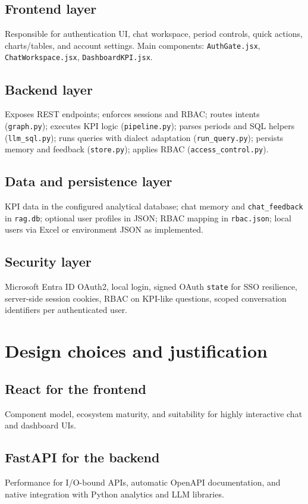 \documentclass[12pt,a4paper,openany]{report}
\begin{document}
\subsection{Frontend layer}
Responsible for authentication UI, chat workspace, period controls, quick actions, charts/tables, and account settings. Main components: \texttt{AuthGate.jsx}, \texttt{ChatWorkspace.jsx}, \texttt{DashboardKPI.jsx}.

\subsection{Backend layer}
Exposes REST endpoints; enforces sessions and RBAC; routes intents (\texttt{graph.py}); executes KPI logic (\texttt{pipeline.py}); parses periods and SQL helpers (\texttt{llm\_sql.py}); runs queries with dialect adaptation (\texttt{run\_query.py}); persists memory and feedback (\texttt{store.py}); applies RBAC (\texttt{access\_control.py}).

\subsection{Data and persistence layer}
KPI data in the configured analytical database; chat memory and \texttt{chat\_feedback} in \texttt{rag.db}; optional user profiles in JSON; RBAC mapping in \texttt{rbac.json}; local users via Excel or environment JSON as implemented.

\subsection{Security layer}
Microsoft Entra ID OAuth2, local login, signed OAuth \texttt{state} for SSO resilience, server-side session cookies, RBAC on KPI-like questions, scoped conversation identifiers per authenticated user.

\section{Design choices and justification}
\subsection{React for the frontend}
Component model, ecosystem maturity, and suitability for highly interactive chat and dashboard UIs.

\subsection{FastAPI for the backend}
Performance for I/O-bound APIs, automatic OpenAPI documentation, and native integration with Python analytics and LLM libraries.
\end{document}
